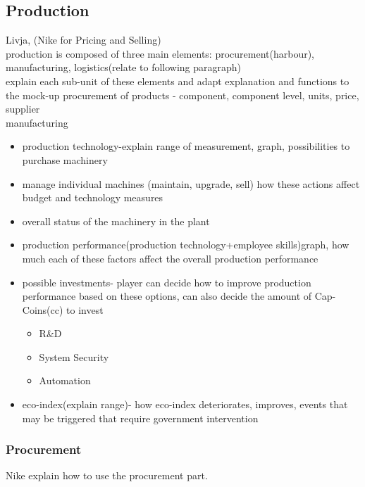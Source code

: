 \documentclass[11pt,titlepage,oneside,openany]{book}
\begin{document}
\subsection{Production}
Livja, (Nike for Pricing and Selling) \\
 production is composed of three main elements: procurement(harbour), manufacturing, logistics(relate to following paragraph)\\
explain each sub-unit of these elements and adapt explanation and functions to the mock-up
procurement of products - component, component level, units, price, supplier \\
manufacturing
\begin{itemize} 
\item production technology-explain range of measurement, graph, possibilities to purchase machinery
\item manage individual machines (maintain, upgrade, sell) how these actions affect budget and technology measures
\item overall status of the machinery in the plant
\item production performance(production technology+employee skills)graph, how much each of these factors affect the overall production performance
 \item possible investments- player can decide how to improve production performance based on these options, can also decide the amount of Cap-Coins(cc) to invest
 \begin{itemize} 
 \item R\&D
 \item System Security
 \item Automation
 \end{itemize}
 \item eco-index(explain range)- how eco-index deteriorates, improves, events that may be triggered that require government intervention
\end{itemize}

\subsubsection{Procurement}
Nike explain how to use the procurement part.
\end{document}
